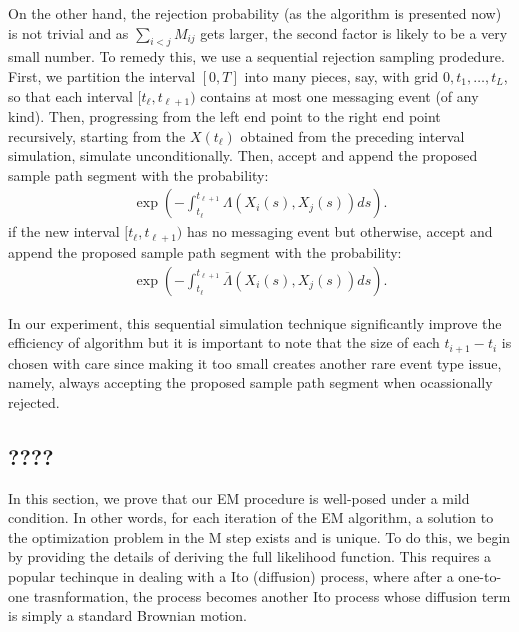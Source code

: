 \documentclass[12pt]{article}%
\begin{document}
On the other hand, the rejection probability (as the algorithm is presented now) is not trivial and as $\sum_{i<j} M_{ij}$ gets larger, the second factor is likely to be a very small number.  To remedy this, we use a sequential rejection sampling prodedure.  First, we partition the interval $[0,T]$ into many pieces, say, with grid $0,t_1,\ldots, t_L$, so that each interval $[t_{\ell},t_{\ell+1})$ contains at most one messaging event (of any kind). Then, progressing from the left end point to the right end point recursively, starting from the $X(t_{\ell})$ obtained from the preceding interval simulation, simulate unconditionally.  Then, accept and append the proposed sample path segment with the probability:
\begin{eqnarray}
\exp\left(-\int_{t_{\ell}}^{t_{\ell+1}} \Lambda(X_i(s),X_j(s)) ds\right).
\end{eqnarray}
if the new interval $[t_{\ell},t_{\ell+1})$ has no messaging event but otherwise, accept and append the proposed sample path segment with the probability:
\begin{eqnarray}
\exp\left(-\int_{t_{\ell}}^{t_{\ell+1}} \overline{\Lambda}(X_i(s),X_j(s)) ds\right).
\end{eqnarray}

In our experiment, this sequential simulation technique significantly improve the efficiency of algorithm but it is important to note that the size of each $t_{i+1} - t_i$ is chosen with care since making it too small creates another rare event type issue, namely, always accepting the proposed sample path segment when ocassionally rejected.   
 

\subsection{????}
In this section, we prove that our EM procedure is well-posed under
a mild condition.  In other words, for each iteration of the EM algorithm,
a solution to the optimization problem in the M step exists and is unique.
To do this, we begin by providing the details 
of deriving the full likelihood function. This requires a popular techinque
in dealing with a Ito (diffusion) process, where after a one-to-one trasnformation, the process becomes another Ito process whose diffusion term is simply a standard Brownian motion.
\end{document}
